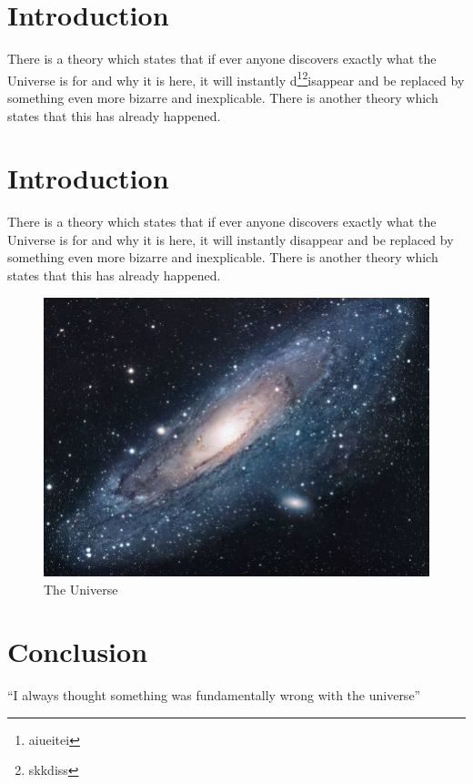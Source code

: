 \documentclass[a4paper,papersize,10pt,twoside,uplatex,dvipdfmx]{jsarticle}
\begin{document}
\section{Introduction}
There is a theory which states that if ever anyone discovers exactly what the Universe is for and why it is here, it will instantly d\footnote{aiueitei}\footnote{skkdiss}isappear and be replaced by something even more bizarre and inexplicable.
There is another theory which states that this has already happened.

\section{Introduction}
There is a theory which states that if ever anyone discovers exactly what the Universe is for and why it is here, it will instantly disappear and be replaced by something even more bizarre and inexplicable.
There is another theory which states that this has already happened.


\begin{figure}[h!]
\centering
\includegraphics[scale=1.7]{universe}
\caption{The Universe}
\label{fig:universe}
\end{figure}

\section{Conclusion}
``I always thought something was fundamentally wrong with the universe'' \citep{adams1995hitchhiker}



\end{document}
